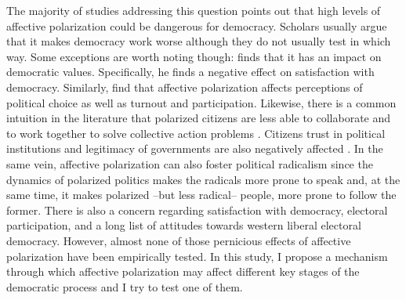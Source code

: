 \documentclass[a4paper, svgnames]{article}
\begin{document}
The majority of studies addressing this question points out that high levels of affective polarization could be dangerous for democracy. Scholars usually argue that it makes democracy work worse although they do not usually test in which way. Some exceptions are worth noting though: \cite{Wagner2021} finds that it has an impact on democratic values. Specifically, he finds a negative effect on satisfaction with democracy. Similarly, \cite{Ward2019} find that affective polarization affects perceptions of political choice as well as turnout and participation. Likewise, there is a common intuition in the literature that polarized citizens are less able to collaborate and to work together to solve collective action problems \citep{Garrett2014}. Citizens trust in political institutions and legitimacy of governments are also negatively affected \citep{Orriols2021}. In the same vein, affective polarization can also foster political radicalism \citep{Levendusky2013, Rogowski2016, Webster2017} since the dynamics of polarized politics makes the radicals more prone to speak and, at the same time, it makes polarized --but less radical-- people, more prone to follow the former. There is also a concern regarding satisfaction with democracy, electoral participation, and a long list of attitudes towards western liberal electoral democracy. However, almost none of those pernicious effects of affective polarization have been empirically tested. In this study, I propose a mechanism through which affective polarization may affect different key stages of the democratic process and I try to test one of them.
\end{document}
